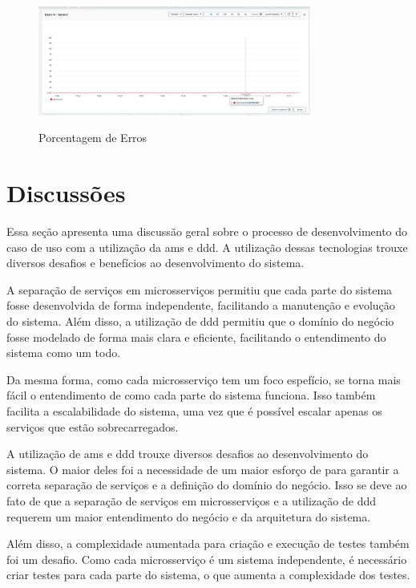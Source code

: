 \begin{figure}[H]
    \centering
    \caption{Porcentagem de Erros}
    \includegraphics[width=0.8\textwidth]{media/errors.png}
    \label{fig:error-rate}
\end{figure}

\section{Discussões}
Essa seção apresenta uma discussão geral sobre o processo de desenvolvimento do caso de uso com a utilização da \acrfull{ams} e \acrfull{ddd}. A utilização dessas tecnologias trouxe diversos desafios e benefícios ao desenvolvimento do sistema.

A separação de serviços em microsserviços permitiu que cada parte do sistema fosse desenvolvida de forma independente, facilitando a manutenção e evolução do sistema. Além disso, a utilização de \acrfull{ddd} permitiu que o domínio do negócio fosse modelado de forma mais clara e eficiente, facilitando o entendimento do sistema como um todo.

Da mesma forma, como cada microsserviço tem um foco espefício, se torna mais fácil o entendimento de como cada parte do sistema funciona. Isso também facilita a escalabilidade do sistema, uma vez que é possível escalar apenas os serviços que estão sobrecarregados.

A utilização de \acrfull{ams} e \acrfull{ddd} trouxe diversos desafios ao desenvolvimento do sistema. O maior deles foi a necessidade de um maior esforço de  para garantir a correta separação de serviços e a definição do domínio do negócio. Isso se deve ao fato de que a separação de serviços em microsserviços e a utilização de \acrfull{ddd} requerem um maior entendimento do negócio e da arquitetura do sistema.

Além disso, a complexidade aumentada para criação e execução de testes também foi um desafio. Como cada microsserviço é um sistema independente, é necessário criar testes para cada parte do sistema, o que aumenta a complexidade dos testes.

